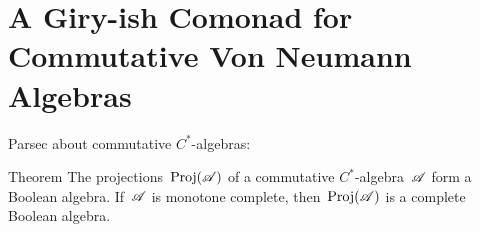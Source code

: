 \documentclass[main]{subfiles}
\begin{document}
\chapter{A Giry-ish Comonad for Commutative Von Neumann Algebras}

\begin{parsec}%
\begin{point}%
Parsec about commutative $C^*$-algebras:
\end{point}
\begin{point}{Theorem}%
The projections~$\operatorname{Proj}(\mathscr{A})$ of a commutative $C^*$-algebra~$\mathscr{A}$
form a Boolean algebra.
If~$\mathscr{A}$ is monotone complete,
then~$\operatorname{Proj}(\mathscr{A})$ is a complete Boolean algebra.
\end{point}
\end{parsec}
\end{document}
